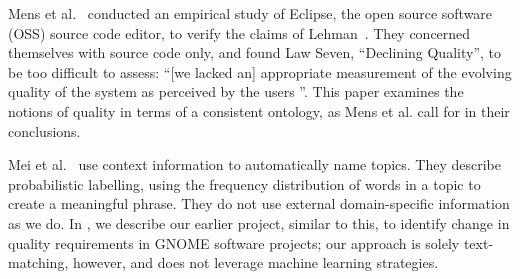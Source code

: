 \documentclass{acm_proc_article-sp}
\begin{document}

Mens et al.~\cite{mens08icsm} conducted an empirical study of Eclipse, the open source software (OSS) source code editor, to verify the claims of Lehman~\cite{lehman97sms}. They concerned themselves with source code only, and found Law Seven, ``Declining Quality'', to be too difficult to assess: ``[we lacked an] appropriate measurement of the evolving quality of the system as perceived by the users \cite[p. 388]{mens08icsm}''. This paper examines the notions of quality in terms of a consistent ontology, as Mens et al. call for in their conclusions.

Mei et al.~\cite{Mei2007} use context information to automatically name topics. They describe probabilistic labelling, using the frequency distribution of words in a topic to create a meaningful phrase. They do not use external domain-specific information as we do.
In \cite{ernst10refsq}, we describe our earlier project, similar to this, to identify change in quality requirements in GNOME software projects; our approach is solely text-matching, however, and does not leverage machine learning strategies.

\end{document}
